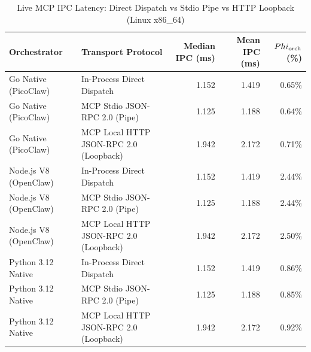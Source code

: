 \begin{table}[t]
\centering\small
\caption{Live MCP IPC Latency: Direct Dispatch vs Stdio Pipe vs HTTP Loopback (Linux x86_64)}
\label{tab:linux_mcp_transport}
\begin{tabular}{llrrr}
\toprule
Orchestrator & Transport Protocol & Median IPC (ms) & Mean IPC (ms) & $\\Phi_{\text{orch}}$ (\%) \\
\midrule
Go Native (PicoClaw) & In-Process Direct Dispatch & 1.152 & 1.419 & 0.65\% \\
Go Native (PicoClaw) & MCP Stdio JSON-RPC 2.0 (Pipe) & 1.125 & 1.188 & 0.64\% \\
Go Native (PicoClaw) & MCP Local HTTP JSON-RPC 2.0 (Loopback) & 1.942 & 2.172 & 0.71\% \\
Node.js V8 (OpenClaw) & In-Process Direct Dispatch & 1.152 & 1.419 & 2.44\% \\
Node.js V8 (OpenClaw) & MCP Stdio JSON-RPC 2.0 (Pipe) & 1.125 & 1.188 & 2.44\% \\
Node.js V8 (OpenClaw) & MCP Local HTTP JSON-RPC 2.0 (Loopback) & 1.942 & 2.172 & 2.50\% \\
Python 3.12 Native & In-Process Direct Dispatch & 1.152 & 1.419 & 0.86\% \\
Python 3.12 Native & MCP Stdio JSON-RPC 2.0 (Pipe) & 1.125 & 1.188 & 0.85\% \\
Python 3.12 Native & MCP Local HTTP JSON-RPC 2.0 (Loopback) & 1.942 & 2.172 & 0.92\% \\
\bottomrule
\end{tabular}
\end{table}
